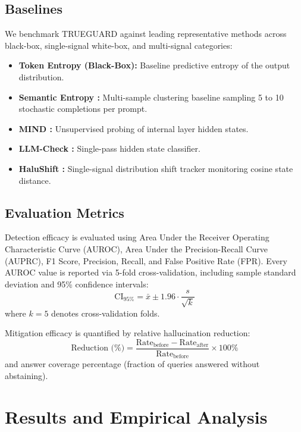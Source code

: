 \documentclass[journal]{IEEEtran}
\begin{document}
\subsection{Baselines}
We benchmark TRUEGUARD against leading representative methods across black-box, single-signal white-box, and multi-signal categories:
\begin{itemize}
    \item \textbf{Token Entropy (Black-Box):} Baseline predictive entropy of the output distribution.
    \item \textbf{Semantic Entropy \cite{kossen2024semantic}:} Multi-sample clustering baseline sampling 5 to 10 stochastic completions per prompt.
    \item \textbf{MIND \cite{su2024mind}:} Unsupervised probing of internal layer hidden states.
    \item \textbf{LLM-Check \cite{sriramanan2024llmcheck}:} Single-pass hidden state classifier.
    \item \textbf{HaluShift \cite{dasgupta2025hallushift}:} Single-signal distribution shift tracker monitoring cosine state distance.
\end{itemize}

\subsection{Evaluation Metrics}
Detection efficacy is evaluated using Area Under the Receiver Operating Characteristic Curve (AUROC), Area Under the Precision-Recall Curve (AUPRC), F1 Score, Precision, Recall, and False Positive Rate (FPR). Every AUROC value is reported via 5-fold cross-validation, including sample standard deviation and 95\% confidence intervals:
\begin{equation}
    \text{CI}_{95\%} = \bar{x} \pm 1.96 \cdot \frac{s}{\sqrt{k}}
\end{equation}
where $k = 5$ denotes cross-validation folds.

Mitigation efficacy is quantified by relative hallucination reduction:
\begin{equation}
    \text{Reduction (\%)} = \frac{\text{Rate}_{\text{before}} - \text{Rate}_{\text{after}}}{\text{Rate}_{\text{before}}} \times 100\%
\end{equation}
and answer coverage percentage (fraction of queries answered without abstaining).

\section{Results and Empirical Analysis}
\end{document}
